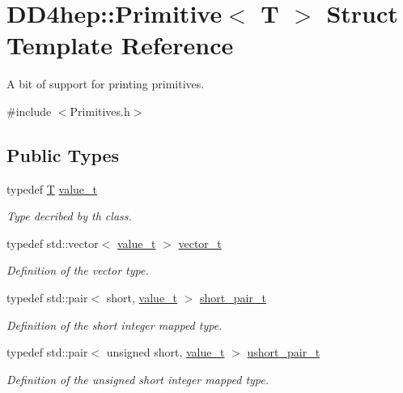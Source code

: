 \hypertarget{struct_d_d4hep_1_1_primitive}{}\section{D\+D4hep\+:\+:Primitive$<$ T $>$ Struct Template Reference}
\label{struct_d_d4hep_1_1_primitive}


A bit of support for printing primitives.  




{\ttfamily \#include $<$Primitives.\+h$>$}

\subsection*{Public Types}
\begin{DoxyCompactItemize}
\item 
typedef \hyperlink{class_t}{T} \hyperlink{struct_d_d4hep_1_1_primitive_a0639e73bb8f07f99c2d8401f807a7af6}{value\+\_\+t}
\begin{DoxyCompactList}\small\item\em Type decribed by th class. \end{DoxyCompactList}\item 
typedef std\+::vector$<$ \hyperlink{struct_d_d4hep_1_1_primitive_a0639e73bb8f07f99c2d8401f807a7af6}{value\+\_\+t} $>$ \hyperlink{struct_d_d4hep_1_1_primitive_a811bb3e2e990b586cd6669ce73de1c50}{vector\+\_\+t}
\begin{DoxyCompactList}\small\item\em Definition of the vector type. \end{DoxyCompactList}\item 
typedef std\+::pair$<$ short, \hyperlink{struct_d_d4hep_1_1_primitive_a0639e73bb8f07f99c2d8401f807a7af6}{value\+\_\+t} $>$ \hyperlink{struct_d_d4hep_1_1_primitive_a50698733dd2401e05ee0d064ef856363}{short\+\_\+pair\+\_\+t}
\begin{DoxyCompactList}\small\item\em Definition of the short integer mapped type. \end{DoxyCompactList}\item 
typedef std\+::pair$<$ unsigned short, \hyperlink{struct_d_d4hep_1_1_primitive_a0639e73bb8f07f99c2d8401f807a7af6}{value\+\_\+t} $>$ \hyperlink{struct_d_d4hep_1_1_primitive_a17a1fe85259c15331aeaa9e4f3f25ac0}{ushort\+\_\+pair\+\_\+t}
\begin{DoxyCompactList}\small\item\em Definition of the unsigned short integer mapped type. \end{DoxyCompactList}\item 

\end{DoxyCompactItemize}
